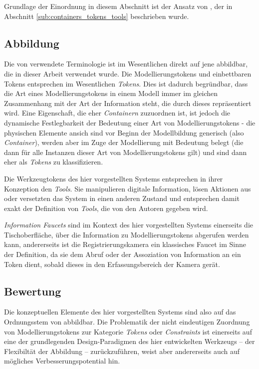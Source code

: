 Grundlage der Einordnung in diesem Abschnitt ist der Ansatz von \citep{Holmquist99}, der in Abschnitt \ref{sub:containers_tokens_tools} beschrieben wurde.

\subsection{Abbildung}

Die von \citeauthor{Holmquist99} verwendete Terminologie ist im Wesentlichen direkt auf jene abbildbar, die in dieser Arbeit verwendet wurde. Die Modellierungstokens und einbettbaren Tokens entsprechen im Wesentlichen \emph{Tokens}. Dies ist dadurch begründbar, dass die Art eines Modellierungstokens in einem Modell immer im gleichen Zusammenhang mit der Art der Information steht, die durch dieses repräsentiert wird. Eine Eigenschaft, die eher \emph{Containern} zuzuordnen ist, ist jedoch die dynamische Festlegbarkeit der Bedeutung einer Art von Modellierungstokens - die physischen Elemente ansich sind vor Beginn der Modellbildung generisch (also \emph{Container}), werden aber im Zuge der Modellierung mit Bedeutung belegt (die dann für alle Instanzen dieser Art von Modellierungstokens gilt) und sind dann eher als \emph{Tokens} zu klassifizieren. 

Die Werkzeugtokens des hier vorgestellten Systems entsprechen in ihrer Konzeption den \emph{Tools}. Sie manipulieren digitale Information, lösen Aktionen aus oder versetzten das System in einen anderen Zustand und entsprechen damit exakt der Definition von \emph{Tools}, die von den Autoren gegeben wird.

\emph{Information Faucets} sind im Kontext des hier vorgestellten Systems einerseits die Tischoberfläche, über die Information zu Modellierungstokens abgerufen werden kann, andererseits ist die Registrierungskamera ein klassisches Faucet im Sinne der Definition, da sie dem Abruf oder der Assoziation von Information an ein Token dient, sobald dieses in den Erfassungsbereich der Kamera gerät.

\subsection{Bewertung}

Die konzeptuellen Elemente des hier vorgestellten Systems sind also auf das Ordnungsstem von \citet{Holmquist99} abbildbar. Die Problematik der nicht eindeutigen Zuordnung von Modellierungstokens zur Kategorie \emph{Tokens} oder \emph{Constraints} ist einerseits auf eine der grundlegenden Design-Paradigmen des hier entwickelten Werkzeugs -- der Flexibiltät der Abbildung -- zurückzuführen, weist aber andererseits auch auf mögliches Verbesserungspotential hin.

